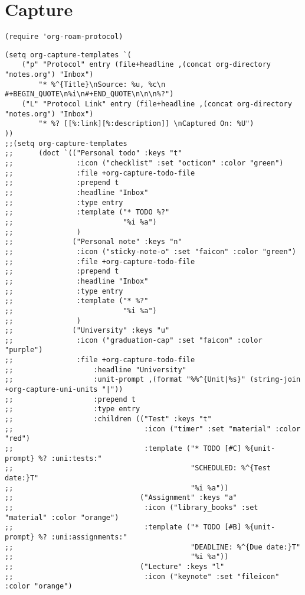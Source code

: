 \documentclass[11pt]{article}
\begin{document}
\section{Capture}
\label{sec:org6d26c2c}
\begin{verbatim}
(require 'org-roam-protocol)
\end{verbatim}
\begin{verbatim}
(setq org-capture-templates `(
    ("p" "Protocol" entry (file+headline ,(concat org-directory "notes.org") "Inbox")
        "* %^{Title}\nSource: %u, %c\n #+BEGIN_QUOTE\n%i\n#+END_QUOTE\n\n\n%?")
    ("L" "Protocol Link" entry (file+headline ,(concat org-directory "notes.org") "Inbox")
        "* %? [[%:link][%:description]] \nCaptured On: %U")
))
;;(setq org-capture-templates
;;      (doct `(("Personal todo" :keys "t"
;;               :icon ("checklist" :set "octicon" :color "green")
;;               :file +org-capture-todo-file
;;               :prepend t
;;               :headline "Inbox"
;;               :type entry
;;               :template ("* TODO %?"
;;                          "%i %a")
;;               )
;;              ("Personal note" :keys "n"
;;               :icon ("sticky-note-o" :set "faicon" :color "green")
;;               :file +org-capture-todo-file
;;               :prepend t
;;               :headline "Inbox"
;;               :type entry
;;               :template ("* %?"
;;                          "%i %a")
;;               )
;;              ("University" :keys "u"
;;               :icon ("graduation-cap" :set "faicon" :color "purple")
;;               :file +org-capture-todo-file
;;                   :headline "University"
;;                   :unit-prompt ,(format "%%^{Unit|%s}" (string-join +org-capture-uni-units "|"))
;;                   :prepend t
;;                   :type entry
;;                   :children (("Test" :keys "t"
;;                               :icon ("timer" :set "material" :color "red")
;;                               :template ("* TODO [#C] %{unit-prompt} %? :uni:tests:"
;;                                          "SCHEDULED: %^{Test date:}T"
;;                                          "%i %a"))
;;                              ("Assignment" :keys "a"
;;                               :icon ("library_books" :set "material" :color "orange")
;;                               :template ("* TODO [#B] %{unit-prompt} %? :uni:assignments:"
;;                                          "DEADLINE: %^{Due date:}T"
;;                                          "%i %a"))
;;                              ("Lecture" :keys "l"
;;                               :icon ("keynote" :set "fileicon" :color "orange")

\end{verbatim}
\end{document}
